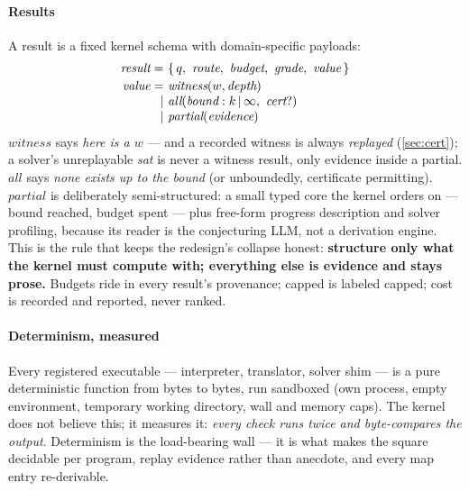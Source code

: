 \paragraph{Results}
A result is a fixed kernel schema with domain-specific payloads:
\[
\begin{array}{r@{\ }l}
\textit{result} = & \{\, q,\ \textit{route},\ \textit{budget},\
  \textit{grade},\ \textit{value} \,\} \\[2pt]
\textit{value} = & \textit{witness}(w, \textit{depth}) \\
\mid & \textit{all}(\textit{bound}: k \,|\, \infty,\ \textit{cert}?) \\
\mid & \textit{partial}(\textit{evidence})
\end{array}
\]
$\textit{witness}$ says \emph{here is a $w$} --- and a recorded
witness is always \emph{replayed} (\cref{sec:cert}); a solver's
unreplayable \textit{sat} is never a witness result, only evidence
inside a partial. $\textit{all}$ says \emph{none exists up to the
bound} (or unboundedly, certificate permitting). $\textit{partial}$
is deliberately semi-structured: a small typed core the kernel
orders on --- bound reached, budget spent --- plus free-form
progress description and solver profiling, because its reader is the
conjecturing LLM, not a derivation engine. This is the rule that
keeps the redesign's collapse honest: \textbf{structure only what
the kernel must compute with; everything else is evidence and stays
prose.} Budgets ride in every result's provenance; capped is labeled
capped; cost is recorded and reported, never ranked.

\paragraph{Determinism, measured}
Every registered executable --- interpreter, translator, solver
shim --- is a pure deterministic function from bytes to bytes, run
sandboxed (own process, empty environment, temporary working
directory, wall and memory caps). The kernel does not believe this;
it measures it: \emph{every check runs twice and byte-compares the
output}. Determinism is the load-bearing wall --- it is what makes
the square decidable per program, replay evidence rather than
anecdote, and every map entry re-derivable.
